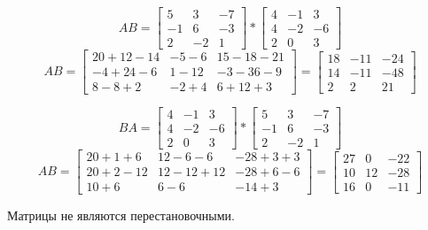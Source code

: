 \documentclass[titlepage]{article}
\begin{document}
\begin{equation}
	AB =
\begin{bmatrix}
	5 & 3 & -7 \\
	-1 & 6 & -3 \\
	2 & -2 & 1
\end{bmatrix}
*
\begin{bmatrix}
	4 & -1 & 3 \\
	4 & -2 & -6 \\
	2 & 0 & 3
\end{bmatrix}
\end{equation}
\begin{equation}
AB
=
\begin{bmatrix}
	20 + 12 -14 & -5 - 6 & 15 - 18 - 21 \\
	-4 + 24 - 6 & 1 - 12 & -3 - 36 - 9 \\
	8 - 8 + 2 & -2 + 4 & 6 + 12 + 3
\end{bmatrix}
=
\begin{bmatrix}
	18 & -11 & -24  \\
	14 & -11 & -48  \\
	2 & 2 & 21
\end{bmatrix}
\end{equation}

\begin{equation}
	BA =
\begin{bmatrix}
	4 & -1 & 3 \\
	4 & -2 & -6 \\
	2 & 0 & 3
\end{bmatrix}
*
\begin{bmatrix}
	5 & 3 & -7 \\
	-1 & 6 & -3 \\
	2 & -2 & 1
\end{bmatrix}
\end{equation}
\begin{equation}
AB
=
\begin{bmatrix}
	20 + 1 + 6 & 12 - 6 - 6 & -28 + 3 + 3 \\
	20 + 2 - 12 & 12 - 12 + 12 & -28 + 6 - 6 \\
	10 + 6 & 6 - 6 & -14 + 3
\end{bmatrix}
=
\begin{bmatrix}
	27 & 0 & -22  \\
	10 & 12 & -28  \\
	16 & 0 & -11 
\end{bmatrix}
\end{equation}

Матрицы не являются перестановочными.
\end{document}
